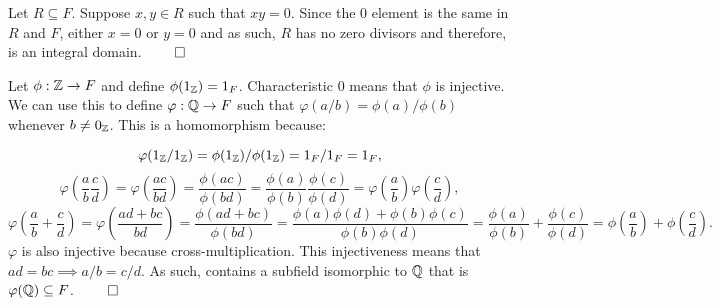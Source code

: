 \documentclass[12pt]{report}
\begin{document}
\sol Let $R \subseteq F$. Suppose $x,y \in R$ such that $xy = 0$. Since the 0 element is the same in $R$ and $F$, either $x=0$ or $y=0$ and as such, $R$ has no zero divisors and therefore, is an integral domain. $\qed$

\sol Let $\phi : \ZZ \to F$ and define $\phi(1_{\ZZ}) = 1_F$. Characteristic 0 means that $\phi$ is injective. We can use this to define $\varphi : \QQ \to F$ such that $\varphi(a/b) = \phi(a)/\phi(b)$ whenever $b \neq 0_{\ZZ}$. This is a homomorphism because:

$$\varphi(1_{\ZZ} / 1_{\ZZ}) = \phi(1_{\ZZ}) / \phi(1_{\ZZ}) = 1_F / 1_F = 1_F,$$
$$\varphi(\frac{a}{b}\frac{c}{d}) = \varphi({\frac{ac}{bd}}) = \frac{\phi(ac)}{\phi(bd)} = \frac{\phi(a)}{\phi(b)}\frac{\phi(c)}{\phi(d)} = \varphi(\frac{a}{b})\varphi(\frac{c}{d}),$$
$$\varphi(\frac{a}{b} + \frac{c}{d}) = \varphi(\frac{ad + bc}{bd}) = \frac{\phi(ad + bc)}{\phi(bd)} = \frac{\phi(a)\phi(d) + \phi(b)\phi(c)}{\phi(b)\phi(d)} = \frac{\phi(a)}{\phi(b)} + \frac{\phi(c)}{\phi(d)} = \phi(\frac{a}{b}) + \phi(\frac{c}{d}).$$
$\varphi$ is also injective because cross-multiplication. This injectiveness means that $ad = bc \implies a/b = c/d$. As such, contains a subfield isomorphic to $\QQ$ that is $\varphi(\QQ) \subseteq F$. $\qed$
\end{document}
